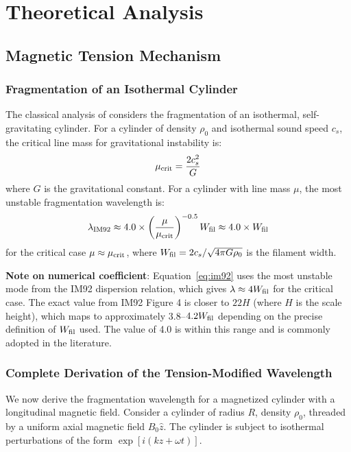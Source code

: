 \documentclass[11pt,a4paper]{article}
\begin{document}
\section{Theoretical Analysis}
\label{sec:theory}

\subsection{Magnetic Tension Mechanism}

\subsubsection{Fragmentation of an Isothermal Cylinder}

The classical analysis of \citet{Inutsuka1992} considers the fragmentation of an isothermal, self-gravitating cylinder. For a cylinder of density $\rho_0$ and isothermal sound speed $c_s$, the critical line mass for gravitational instability is:
\begin{equation}
\mu_{\rm crit} = \frac{2c_s^2}{G}
\end{equation}
where $G$ is the gravitational constant. For a cylinder with line mass $\mu$, the most unstable fragmentation wavelength is:
\begin{equation}
\lambda_{\rm IM92} \approx 4.0 \times \left(\frac{\mu}{\mu_{\rm crit}}\right)^{-0.5} W_{\rm fil} \approx 4.0 \times W_{\rm fil}
\label{eq:im92}
\end{equation}
for the critical case $\mu \approx \mu_{\rm crit}$, where $W_{\rm fil} = 2c_s/\sqrt{4\pi G\rho_0}$ is the filament width.

\textbf{Note on numerical coefficient}: Equation~\ref{eq:im92} uses the most unstable mode from the IM92 dispersion relation, which gives $\lambda \approx 4W_{\rm fil}$ for the critical case. The exact value from IM92 Figure 4 is closer to $22H$ (where $H$ is the scale height), which maps to approximately 3.8--$4.2 W_{\rm fil}$ depending on the precise definition of $W_{\rm fil}$ used. The value of 4.0 is within this range and is commonly adopted in the literature.

\subsubsection{Complete Derivation of the Tension-Modified Wavelength}

We now derive the fragmentation wavelength for a magnetized cylinder with a longitudinal magnetic field. Consider a cylinder of radius $R$, density $\rho_0$, threaded by a uniform axial magnetic field $B_0 \hat{z}$. The cylinder is subject to isothermal perturbations of the form $\exp[i(kz + \omega t)]$.
\end{document}
